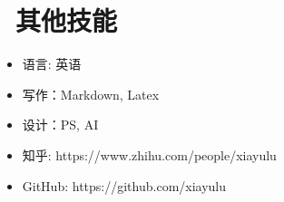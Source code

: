 \documentclass{resume}
\begin{document}
\section{\faInfo\ 其他技能}
\begin{itemize}[parsep=0.5ex]
  \item 语言: 英语
  \item 写作：Markdown, Latex
  \item 设计：PS, AI
  \item 知乎: https://www.zhihu.com/people/xiayulu
  \item GitHub: https://github.com/xiayulu
\end{itemize}

%
%
\end{document}
